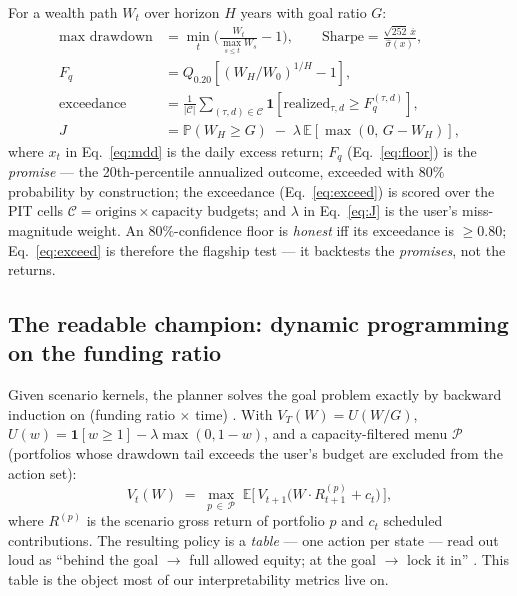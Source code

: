 \documentclass[11pt]{article}
\newcommand{\E}{\mathbb{E}}
\newcommand{\Prob}{\mathbb{P}}
\newcommand{\ind}{\mathbf{1}}
\begin{document}
For a wealth path $W_t$ over horizon $H$ years with goal ratio $G$:
\begin{align}
\text{max drawdown} &= \min_{t}\Big(\frac{W_t}{\max_{s\le t} W_s} - 1\Big), \qquad
\text{Sharpe} = \frac{\sqrt{252}\,\overline{x}}{\hat\sigma(x)},
\label{eq:mdd}\\[4pt]
F_{q} &= Q_{0.20}\!\left[(W_H/W_0)^{1/H} - 1\right],
\label{eq:floor}\\[4pt]
\text{exceedance} &= \frac{1}{|\mathcal{C}|}\sum_{(\tau,d)\in\mathcal{C}}
\ind\!\left[\text{realized}_{\tau,d} \ge F_q^{(\tau,d)}\right],
\label{eq:exceed}\\[4pt]
J &= \Prob(W_H \ge G) \;-\; \lambda\,\E\!\left[\max(0,\, G - W_H)\right],
\label{eq:J}
\end{align}
where $x_t$ in Eq.~\ref{eq:mdd} is the daily excess return; $F_q$ (Eq.~\ref{eq:floor}) is the
\emph{promise} --- the 20th-percentile annualized outcome, exceeded with $80\%$ probability by
construction; the exceedance (Eq.~\ref{eq:exceed}) is scored over the PIT cells
$\mathcal{C} = \text{origins} \times \text{capacity budgets}$; and $\lambda$ in Eq.~\ref{eq:J}
is the user's miss-magnitude weight. An $80\%$-confidence floor is \emph{honest} iff
its exceedance is $\ge 0.80$; Eq.~\ref{eq:exceed} is therefore the flagship test --- it
backtests the \emph{promises}, not the returns.

\subsection{The readable champion: dynamic programming on the funding ratio}
\label{sec:dp}

Given scenario kernels, the planner solves the goal problem exactly by backward induction on
(funding ratio $\times$ time) \citep{das2020goals}. With $V_T(W) = U(W/G)$,
$U(w) = \ind[w\ge1] - \lambda\max(0,1-w)$, and a capacity-filtered menu $\mathcal{P}$
(portfolios whose drawdown tail exceeds the user's budget are excluded from the action set):
\begin{equation}
V_t(W) \;=\; \max_{p\,\in\,\mathcal{P}}\;
\E\big[\,V_{t+1}\!\big(W\cdot R^{(p)}_{t+1} + c_t\big)\,\big],
\label{eq:bellman}
\end{equation}
where $R^{(p)}$ is the scenario gross return of portfolio $p$ and $c_t$ scheduled
contributions. The resulting policy is a \emph{table} --- one action per state --- read out
loud as ``behind the goal $\to$ full allowed equity; at the goal $\to$ lock it in''
\citep{browne1999}. This table is the object most of our interpretability metrics live on.
\end{document}
